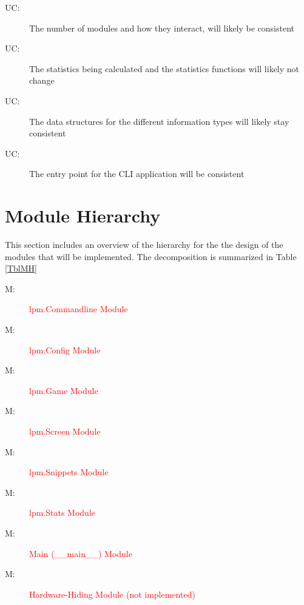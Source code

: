 \documentclass[12pt, titlepage]{article}
\newcounter{ucnum}
\newcommand{\uctheucnum}{UC\theucnum}
\newcounter{mnum}
\newcommand{\mthemnum}{M\themnum}
\begin{document}
\begin{description}
\item[ \uctheucnum \label{uc1}:] The number of modules and how they interact, will likely be consistent
\item[ \uctheucnum \label{uc2}:] The statistics being calculated and the statistics functions will likely not change
\item [ \uctheucnum \label{uc3}:] The data structures for the different information types will likely stay consistent
\item [ \uctheucnum \label{uc4}:] The entry point for the CLI application will be consistent
\end{description}

\section{Module Hierarchy} \label{SecMH}

This section includes an overview of the hierarchy for the the design of the modules that will be implemented. The decomposition is summarized in Table \ref{TblMH}

\begin{description}
\item [ \mthemnum \label{mCl}:] \textcolor{red}{lpm.Commandline Module}
\item [ \mthemnum \label{mCg}:] \textcolor{red}{lpm.Config Module}
\item [ \mthemnum \label{mGm}:] \textcolor{red}{lpm.Game Module}
\item [ \mthemnum \label{mSc}:] \textcolor{red}{lpm.Screen Module}
\item [ \mthemnum \label{mD}:] \textcolor{red}{lpm.Snippets Module}
\item [ \mthemnum \label{mSt}:] \textcolor{red}{lpm.Stats Module}
\item [ \mthemnum \label{mMa}:] \textcolor{red}{Main (\_\_main\_\_) Module}
\item [ \mthemnum \label{mHH}:] \textcolor{red}{Hardware-Hiding Module (not implemented)}
\end{description}
\end{document}
